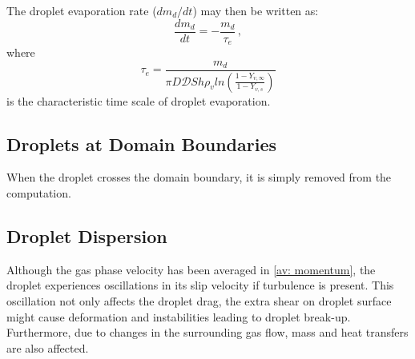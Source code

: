 The droplet evaporation rate ($dm_d/dt$) may then be written as:
\begin{equation}
 \frac{dm_d}{dt}=-\frac{m_d}{\tau_e} \, ,
\end{equation}
where
\begin{equation}\label{eq: tau_e}
 \tau_e = \frac{m_d}{\pi D \mathcal{D} Sh \rho_v ln \left(
\frac{1-Y_{v,\infty}}{1-Y_{v,s}} \right)}
\end{equation}
is the characteristic time scale of droplet evaporation.



% 
% 
% 
% 
% 

\subsection{Droplets at Domain Boundaries}

When the droplet crosses the domain boundary, it is simply removed from the computation.

\subsection{Droplet Dispersion}

Although the gas phase velocity has been averaged in \eqref{av: momentum}, the droplet experiences oscillations in its slip velocity if turbulence is present.
This oscillation not only affects the droplet drag, the extra shear on droplet surface might cause deformation and instabilities leading to droplet break-up.
Furthermore, due to changes in the surrounding gas flow, mass and heat transfers are also affected. 

